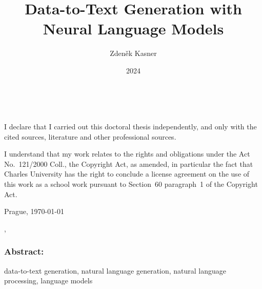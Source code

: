 \documentclass[12pt,notitlepage,a4paper,openright]{report}
\title{Data-to-Text Generation with Neural Language Models}
\author{Zdeněk Kasner}
\date{2024}
\begin{document}
%
%
%
\renewcommand{\thepage}{\roman{page}}
\renewcommand\cite{\citep}
\maketitle

\pagestyle{plain}
\normalsize
\setcounter{page}{2}

\cleardoublepage{}
\ \vspace{10mm}

\noindent \it

\vspace{\fill}
\noindent \rm
I declare that I carried out this doctoral thesis independently,
and only with the cited sources, literature and other professional sources.

I understand that my work relates to the rights and obligations
under the Act No.~121/2000 Coll., the Copyright Act, as amended,
in particular the fact that Charles University has the right
to conclude a license agreement on the use of this work as a school work
pursuant to Section~60 paragraph~1 of the Copyright Act.

\vspace{2cm}
\noindent Prague, \today \hspace{\fill}\theauthor %



\cleardoublepage{} %
\pagestyle{plain}


\begin{description}[leftmargin=7.5em,labelwidth=7em,labelindent=0em,labelsep=0.5em]
  \item[Title:] \thetitle{}
  \item[Author:] \theauthor{}
  \item[Department:] \thedept{}
  \item[Supervisor:] \thesupervisor{},\\ \thedept{}
\end{description}
\subsubsection{Abstract:}



\begin{description}[leftmargin=7.5em,labelwidth=7em,labelindent=0em,labelsep=0.5em]
  \item[Keywords:] data-to-text generation, natural language generation, natural language processing, language models
\end{description}
\end{document}
